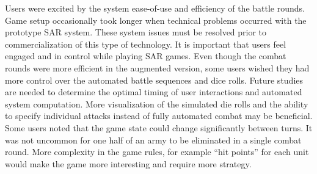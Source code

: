 \documentclass[10pt,twocolumn,letterpaper]{article}
\begin{document}
Users were excited by the system ease-of-use and efficiency 
of the battle rounds.
Game setup 
occasionally 
took longer when technical problems occurred
with the prototype SAR system.  These system issues must be resolved
prior to commercialization of this type of technology.
It is important that users feel engaged and in control while 
playing SAR games.
Even though the combat rounds were more efficient in
the augmented version,
some users wished they had more control over the automated battle
sequences and dice rolls.
Future studies are needed to determine
the optimal timing of user interactions and automated system computation.
More visualization of the simulated die rolls and the ability to specify individual attacks instead of fully automated combat
may be beneficial.  Some users noted that the
game state could change significantly between turns.  It was not
uncommon for one half of an army to be eliminated in a single 
combat round.  More complexity in the game rules, for example ``hit points'' for each unit
would make the game more interesting and require more strategy.




\end{document}

